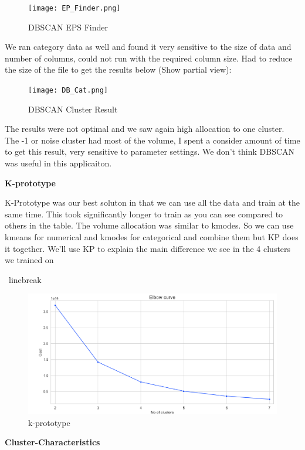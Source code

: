 \documentclass[conference]{IEEEtran}
\begin{document}
\begin{figure}[!h]
	\texttt{[image: EP\_Finder.png]}
	\caption{DBSCAN EPS Finder}
	\label{fig: EPS Finder}
 \end{figure}
We ran category data as well and found it very sensitive to the size of data and number of columns, could not run with the required column size.  Had to reduce the size of the file to get the results below (Show partial view):

\begin{figure}[!h]
	\texttt{[image: DB\_Cat.png]}
	\caption{DBSCAN Cluster Result}
	\label{fig: DBSCAN Cluster Result}
 \end{figure}
The results were not optimal and we saw again high allocation to one cluster. The -1 or noise cluster had most of the volume,  I spent a consider amount of time to get this result, very sensitive to parameter settings.  We don't think DBSCAN was useful in this applicaiton.

\begin{center} 
\textbf{K-prototype} 
\end{center}

K-Prototype was our best soluton in that we can use all the data and train at the same time.  This took significantly longer to train as you can see compared to others in the table.  The volume allocation was similar to kmodes.  So we can use kmeans for numerical and kmodes for categorical and combine them but KP does it together.  We'll use KP to explain the main difference we see in the 4 clusters we trained on

\ linebreak
 \begin{figure}[!h]
	\includegraphics[width=\linewidth]{KPrototype_Elbow.png}
	\caption{k-prototype}
	\label{fig: kprototype elbow chart}
 \end{figure}

\textbf{Cluster-Characteristics} \linebreak
\end{document}
